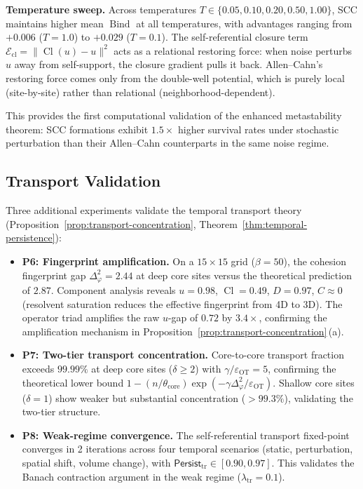 \documentclass[lettersize,journal]{IEEEtran}
\DeclareMathOperator{\Cl}{Cl}
\DeclareMathOperator{\Bind}{Bind}
\begin{document}
\textbf{Temperature sweep.} Across temperatures $T \in \{0.05, 0.10, 0.20, 0.50, 1.00\}$, SCC maintains higher mean $\Bind$ at all temperatures, with advantages ranging from $+0.006$ ($T = 1.0$) to $+0.029$ ($T = 0.1$). The self-referential closure term $\mathcal{E}_{\mathrm{cl}} = \|\Cl(u) - u\|^2$ acts as a relational restoring force: when noise perturbs $u$ away from self-support, the closure gradient pulls it back. Allen--Cahn's restoring force comes only from the double-well potential, which is purely local (site-by-site) rather than relational (neighborhood-dependent).

This provides the first computational validation of the enhanced metastability theorem: SCC formations exhibit $1.5\times$ higher survival rates under stochastic perturbation than their Allen--Cahn counterparts in the same noise regime.

\subsection{Transport Validation}

Three additional experiments validate the temporal transport theory (Proposition~\ref{prop:transport-concentration}, Theorem~\ref{thm:temporal-persistence}):

\begin{itemize}
\item \textbf{P6: Fingerprint amplification.} On a $15 \times 15$ grid ($\beta = 50$), the cohesion fingerprint gap $\Delta_\varphi^2 = 2.44$ at deep core sites versus the theoretical prediction of $2.87$. Component analysis reveals $u = 0.98$, $\Cl = 0.49$, $D = 0.97$, $C \approx 0$ (resolvent saturation reduces the effective fingerprint from 4D to 3D). The operator triad amplifies the raw $u$-gap of $0.72$ by $3.4\times$, confirming the amplification mechanism in Proposition~\ref{prop:transport-concentration}\,(a).

\item \textbf{P7: Two-tier transport concentration.} Core-to-core transport fraction exceeds $99.99\%$ at deep core sites ($\delta \geq 2$) with $\gamma/\varepsilon_{\mathrm{OT}} = 5$, confirming the theoretical lower bound $1 - (n/\theta_{\mathrm{core}})\exp(-\gamma\Delta_\varphi^2/\varepsilon_{\mathrm{OT}})$. Shallow core sites ($\delta = 1$) show weaker but substantial concentration ($>99.3\%$), validating the two-tier structure.

\item \textbf{P8: Weak-regime convergence.} The self-referential transport fixed-point converges in 2 iterations across four temporal scenarios (static, perturbation, spatial shift, volume change), with $\mathsf{Persist}_{\mathrm{tr}} \in [0.90, 0.97]$. This validates the Banach contraction argument in the weak regime ($\lambda_{\mathrm{tr}} = 0.1$).
\end{itemize}
\end{document}
